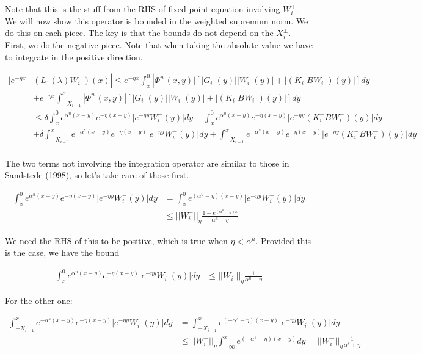 \documentclass[12pt]{article}
\begin{document}
Note that this is the stuff from the RHS of fixed point equation involving $W_i^\pm$. We will now show this operator is bounded in the weighted supremum norm. We do this on each piece. The key is that the bounds do not depend on the $X_i^\pm$. First, we do the negative piece. Note that when taking the absolute value we have to integrate in the positive direction.

\begin{align*}
|e^{-\eta x} & (L_1(\lambda)W_i^-)(x) | \leq  e^{-\eta x} \int_x^0 |\Phi^u_-(x, y)|[|G_i^-(y)||W_i^-(y)| + |(K_i^- B W_i^-)(y)| ] dy \\
&+ e^{-\eta x} \int_{-X_{i-1}}^x |\Phi^u_-(x, y)|[|G_i^-(y)||W_i^-(y)| + |(K_i^- B W_i^-)(y)| ] dy \\
&\leq \delta \int_x^0 e^{\alpha^u (x-y)}e^{-\eta(x-y)}|e^{-\eta y} W_i^-(y)| dy 
+ \int_x^0 e^{\alpha^u (x-y)}e^{-\eta(x-y)}|e^{-\eta y} (K_i^- B W_i^-)(y)| dy \\
&+ \delta \int_{-X_{i-1}}^x e^{-\alpha^s (x-y)}e^{-\eta(x-y)}|e^{-\eta y} W_i^-(y)| dy 
+ \int_{-X_{i-1}}^x e^{-\alpha^s (x-y)}e^{-\eta(x-y)}|e^{-\eta y} (K_i^- B W_i^-)(y)| dy  \\ 
\end{align*}

The two terms not involving the integration operator are similar to those in Sandstede (1998), so let's take care of those first.

\begin{align*}
\int_x^0 e^{\alpha^u (x-y)}e^{-\eta(x-y)}|e^{-\eta y} W_i^-(y)| dy &= \int_x^0 e^{(\alpha^u - \eta) (x-y)}|e^{-\eta y} W_i^-(y)| dy \\
&\leq ||W_i^-||_\eta \frac{1 - e^{(\alpha^u - \eta)x}}{\alpha^u - \eta}
\end{align*}

We need the RHS of this to be positive, which is true when $\eta < \alpha^u$. Provided this is the case, we have the bound

\begin{align*}
\int_x^0 e^{\alpha^u (x-y)}e^{-\eta(x-y)}|e^{-\eta y} W_i^-(y)| dy &\leq ||W_i^-||_\eta \frac{1}{\alpha^u - \eta}
\end{align*}

For the other one:

\begin{align*}
\int_{-X_{i-1}}^x e^{-\alpha^s (x-y)}e^{-\eta(x-y)}|e^{-\eta y} W_i^-(y)| dy &= \int_{-X_{i-1}}^x e^{(-\alpha^s - \eta) (x-y)}|e^{-\eta y} W_i^-(y)| dy \\
&\leq ||W_i^-||_\eta \int_{-\infty}^x e^{(-\alpha^s - \eta) (x-y)} dy = ||W_i^-||_\eta \frac{1}{\alpha^s + \eta}
\end{align*}
\end{document}
